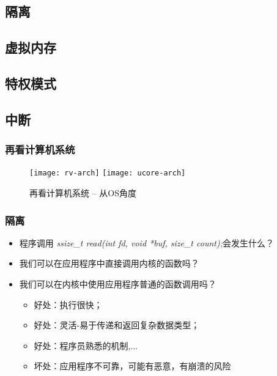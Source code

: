 \subsection{隔离} %
\subsection{虚拟内存}
\subsection{特权模式}
\subsection{中断}

\begin{frame}

\frametitle{再看计算机系统}

\begin{figure}
	\centering
	\texttt{[image: rv-arch]}
	\texttt{[image: ucore-arch]}	
	\caption{再看计算机系统 -- 从OS角度}
\end{figure}


\end{frame}




\begin{frame}
	\frametitle{隔离}
	\begin{itemize}
		\item 程序调用 \textit{ssize\_t read(int fd, void *buf, size\_t count);}会发生什么？
		\item 我们可以在应用程序中直接调用内核的函数吗？
		\item 我们可以在内核中使用应用程序普通的函数调用吗？
		\begin{itemize}
			\item 好处：执行很快；
			\item 好处：灵活-易于传递和返回复杂数据类型；
			\item 好处：程序员熟悉的机制,...
			\item 坏处：应用程序不可靠，可能有恶意，有崩溃的风险
			
		\end{itemize}
	\end{itemize}
\end{frame}



